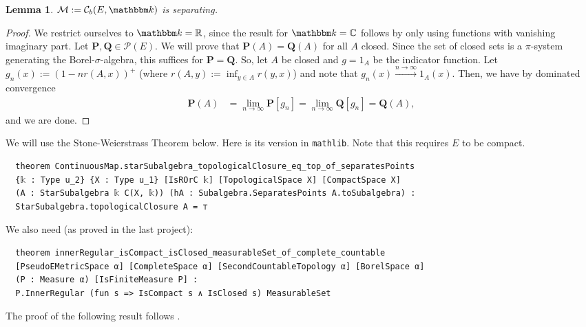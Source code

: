 \documentclass{article}
\newtheorem{lemma}[proposition]{Lemma}
\theoremstyle{definition}
\theoremstyle{step} \newtheorem{step}{Step}
\newcommand{\leanline}[1]{\texttt{#1}}%
\begin{document}
\begin{lemma}\label{l:unique}
  $\mathcal M := \mathcal C_b(E, \mathbbm k)$ is separating.
\end{lemma}

\begin{proof}
  We restrict ourselves to $\mathbbm k = \mathbb R$, since the result
  for $\mathbbm k = \mathbb C$ follows by only using functions with
  vanishing imaginary part. Let $\mathbf P, \mathbf Q \in \mathcal
    P(E)$. We will prove that $\mathbf P(A) = \mathbf Q(A)$ for all $A$
  closed. Since the set of closed sets is a $\pi$-system generating
  the Borel-$\sigma$-algebra, this suffices for $\mathbf P = \mathbf
    Q$. So, let $A$ be closed and $g = 1_A$ be the indicator
  function. Let $g_n(x) := (1 - n r(A,x))^+$ (where $r(A,y) := \inf_{y\in
      A}r(y,x)$) and note that $g_n(x) \xrightarrow{n\to\infty}
    1_A(x)$. Then, we have by dominated convergence
  \begin{align*}
    \mathbf P(A) & = \lim_{n\to\infty} \mathbf P[g_n] =
    \lim_{n\to\infty} \mathbf Q[g_n] = \mathbf Q(A),
  \end{align*}
  and we are done.
\end{proof}

We will use the Stone-Weierstrass Theorem below. Here is its version
in \leanline{mathlib}. Note that this requires $E$ to be compact.

\begin{verbatim}
  theorem ContinuousMap.starSubalgebra_topologicalClosure_eq_top_of_separatesPoints
  {𝕜 : Type u_2} {X : Type u_1} [IsROrC 𝕜] [TopologicalSpace X] [CompactSpace X]
  (A : StarSubalgebra 𝕜 C(X, 𝕜)) (hA : Subalgebra.SeparatesPoints A.toSubalgebra) :
  StarSubalgebra.topologicalClosure A = ⊤
\end{verbatim}

We also need (as proved in the last project):

\begin{verbatim}
  theorem innerRegular_isCompact_isClosed_measurableSet_of_complete_countable
  [PseudoEMetricSpace α] [CompleteSpace α] [SecondCountableTopology α] [BorelSpace α]
  (P : Measure α) [IsFiniteMeasure P] :
  P.InnerRegular (fun s => IsCompact s ∧ IsClosed s) MeasurableSet
\end{verbatim}

The proof of the following result follows
\cite[Theorem~3.4.5]{EthierKurtz1986}.
\end{document}
